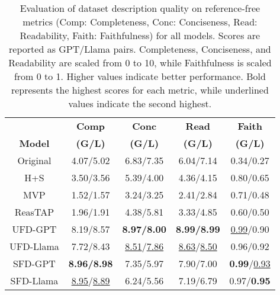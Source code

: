 \begin{table}
\begin{center}
  \begin{tabular}{c|cccc}
    \hline
    \bf & \bf Comp & \bf Conc & \bf Read& \bf Faith \\
    \bf Model & \bf (G/L) & \bf (G/L) & \bf (G/L) & \bf (G/L) \\
    \hline
    Original & 4.07/5.02 & 6.83/7.35 & 6.04/7.14 & 0.34/0.27 \\
    \hline
    H+S & 3.50/3.56 & 5.39/4.00 & 4.36/4.15 & 0.80/0.65 \\
    MVP & 1.52/1.57 & 3.24/3.25 & 2.41/2.84 & 0.71/0.48 \\
    ReasTAP & 1.96/1.91 & 4.38/5.81 & 3.33/4.85 & 0.60/0.50 \\
    \hline
    UFD-GPT & 8.19/8.57 & \bf 8.97/8.00 & \bf 8.99/8.99 & \underline{0.99}/0.90 \\
    UFD-Llama & 7.72/8.43 & \underline{8.51}/\underline{7.86} & \underline{8.63}/\underline{8.50} & 0.96/0.92 \\
    SFD-GPT & \bf 8.96/8.98 & 7.35/5.97 & 7.90/7.00 & \textbf{0.99}/\underline{0.93} \\
    SFD-Llama & \underline{8.95}/\underline{8.89} & 6.24/5.56 & 7.19/6.79 & 0.97/\bf 0.95 \\
    \hline
  \end{tabular}
\end{center}
\caption{Evaluation of dataset description quality on reference-free metrics (Comp: Completeness, Conc: Conciseness, Read: Readability, Faith: Faithfulness) for all models. Scores are reported as GPT/Llama pairs. Completeness, Conciseness, and Readability are scaled from 0 to 10, while Faithfulness is scaled from 0 to 1. Higher values indicate better performance. Bold represents the highest scores for each metric, while underlined values indicate the second highest.}
  \label{tab:eval_reference_all}
\vspace{-.3cm}
\end{table}



